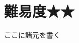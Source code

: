 \documentclass[main]{subfiles}
\begin{document}
\chapter{難易度★★}
ここに諸元を書く \cite{ref:mnih2013playing}
\end{document}
